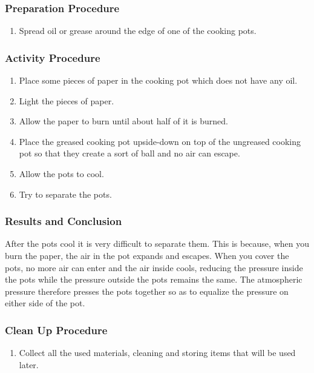 \subsubsection*{Preparation Procedure}
\begin{enumerate}
\item{Spread oil or grease around the edge of one of the cooking pots.} 
\end{enumerate}

\subsubsection*{Activity Procedure}
\begin{enumerate}
\item{Place some pieces of paper in the cooking pot which does not have any oil.} 
\item{Light the pieces of paper.} 
\item{Allow the paper to burn until about half of it is burned.} 
\item{Place the greased cooking pot upside-down on top of the ungreased cooking pot so that they create a sort of ball and no air can escape.} 
\item{Allow the pots to cool.} 
\item{Try to separate the pots.} 
\end{enumerate}

\subsubsection*{Results and Conclusion}
After the pots cool it is very difficult to separate them. This is because, when you burn the paper, the air in the pot expands and escapes. When you cover the pots, no more air can enter and the air inside cools, reducing the pressure inside the pots while the pressure outside the pots remains the same. The atmospheric pressure therefore presses the pots together so as to equalize the pressure on either side of the pot. 

\subsubsection*{Clean Up Procedure}
\begin{enumerate}
\item{Collect all the used materials, cleaning and storing items that will be used later.} 
\end{enumerate}

